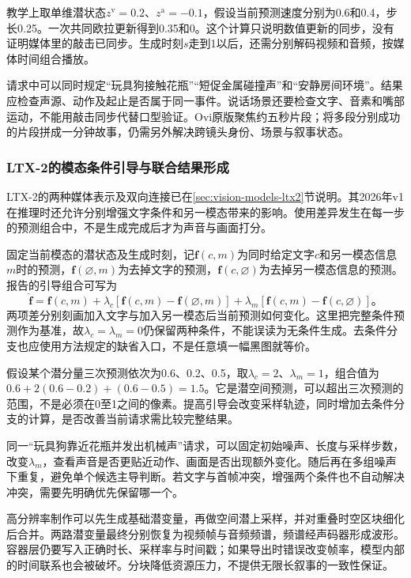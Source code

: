 教学上取单维潜状态$z^{\mathrm v}=0.2$、$z^{\mathrm a}=-0.1$，假设当前预测速度分别为0.6和0.4，步长0.25。一次共同欧拉更新得到0.35和0。这个计算只说明数值更新的同步，没有证明媒体里的敲击已同步。生成时刻$s$走到1以后，还需分别解码视频和音频，按媒体时间组合播放。

请求中可以同时规定“玩具狗接触花瓶”“短促金属碰撞声”和“安静房间环境”。结果应检查声源、动作及起止是否属于同一事件。说话场景还要检查文字、音素和嘴部运动，不能用敲击同步代替口型验证。Ovi原版聚焦约五秒片段；将多段分别成功的片段拼成一分钟故事，仍需另外解决跨镜头身份、场景与叙事状态。

\subsubsection{LTX-2的模态条件引导与联合结果形成}
\label{sec:vision-multigen-ltx}

LTX-2的两种媒体表示及双向连接已在\ref{sec:vision-models-ltx2}节说明。其2026年v1在推理时还允许分别增强文字条件和另一模态带来的影响。使用差异发生在每一步的预测组合中，不是生成完成后才为声音与画面打分。

固定当前模态的潜状态及生成时刻，记$\bm f(c,m)$为同时给定文字$c$和另一模态信息$m$时的预测，$\bm f(\varnothing,m)$为去掉文字的预测，$\bm f(c,\varnothing)$为去掉另一模态信息的预测。报告的引导组合可写为
\begin{equation}
 \widehat{\bm f}
 =\bm f(c,m)
  +\lambda_c[\bm f(c,m)-\bm f(\varnothing,m)]
  +\lambda_m[\bm f(c,m)-\bm f(c,\varnothing)]\text{。}
 \label{eq:vision-modality-guidance}
\end{equation}
两项差分别刻画加入文字与加入另一模态后当前预测如何变化。这里把完整条件预测作为基准，故$\lambda_c=\lambda_m=0$仍保留两种条件，不能误读为无条件生成。去条件分支也应使用方法规定的缺省入口，不是任意填一幅黑图就等价。

假设某个潜分量三次预测依次为0.6、0.2、0.5，取$\lambda_c=2$、$\lambda_m=1$，组合值为$0.6+2(0.6-0.2)+(0.6-0.5)=1.5$。它是潜空间预测，可以超出三次预测的范围，不是必须在0至1之间的像素。提高引导会改变采样轨迹，同时增加去条件分支的计算，是否改善当前请求需比较完整结果。

同一“玩具狗靠近花瓶并发出机械声”请求，可以固定初始噪声、长度与采样步数，改变$\lambda_m$，查看声音是否更贴近动作、画面是否出现额外变化。随后再在多组噪声下重复，避免单个候选主导判断。若文字与首帧冲突，增强两个条件也不自动解决冲突，需要先明确优先保留哪一个。

高分辨率制作可以先生成基础潜变量，再做空间潜上采样，并对重叠时空区块细化后合并。两路潜变量最终分别恢复为视频帧与音频频谱，频谱经声码器形成波形。容器层仍要写入正确时长、采样率与时间戳；如果导出时错误改变帧率，模型内部的时间联系也会被破坏。分块降低资源压力，不提供无限长叙事的一致性保证。

